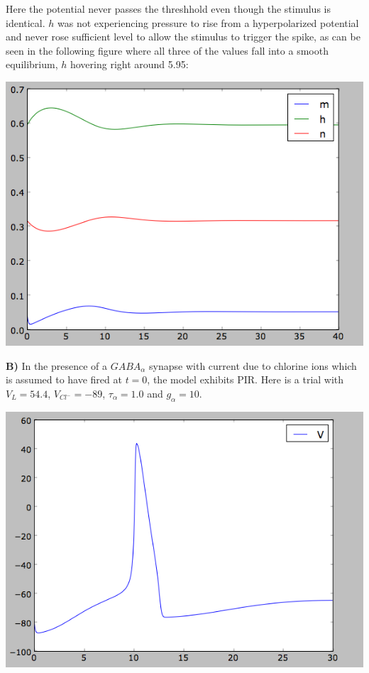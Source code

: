 \documentclass[12pt]{article}
\begin{document}
Here the potential never passes the threshhold even though the stimulus is identical.  $h$ was not experiencing pressure to rise from a hyperpolarized potential and never rose sufficient level to allow the stimulus to trigger the spike, as can be seen in the following figure where all three of the values fall into a smooth equilibrium, $h$ hovering right around 5.95:

\vspace{10pt}
\includegraphics[scale=0.41]{mhnnonhyper.png}
\vspace{10pt}

{\bf B)}  In the presence of a $GABA_\alpha$ synapse with current due to chlorine ions which is assumed to have fired at $t=0$, the model exhibits PIR.  Here is a trial with $V_L=54.4$, $V_{Cl^-}=-89$, $\tau_\alpha=1.0$ and $g_\alpha=10$.  

\vspace{10pt}
\includegraphics[scale=0.54]{gaba.png}
\vspace{10pt}
\end{document}
